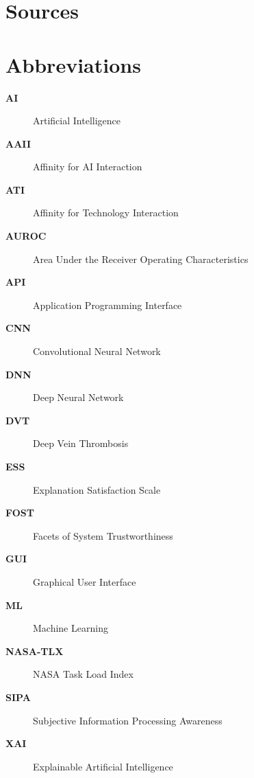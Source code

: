 {}
\listoffigures
\clearpage

{}
\listoftables
\clearpage

{}
\renewcommand*{\listlistingname}{List of Source Codes}
\listoflistings
\clearpage

{}
\chapter*{Sources}

\printbibliography[heading=subbibintoc, nottype=online, nottype=software]

\printbibliography[heading=subbibintoc, type=online, title=Websites]

\printbibliography[heading=subbibintoc, type=software, title=Software]
\clearpage

{}
\chapter*{Abbreviations}
\begin{description}
    \item [\textbf{AI}] Artificial Intelligence
    \item [\textbf{AAII}] Affinity for AI Interaction
    \item [\textbf{ATI}] Affinity for Technology Interaction
    \item [\textbf{AUROC}] Area Under the Receiver Operating Characteristics
    \item [\textbf{API}] Application Programming Interface
    \item [\textbf{CNN}] Convolutional Neural Network
    \item [\textbf{DNN}] Deep Neural Network
    \item [\textbf{DVT}] Deep Vein Thrombosis
    \item [\textbf{ESS}] Explanation Satisfaction Scale
    \item [\textbf{FOST}] Facets of System Trustworthiness
    \item [\textbf{GUI}] Graphical User Interface
    \item [\textbf{ML}] Machine Learning
    \item [\textbf{NASA-TLX}] NASA Task Load Index
    \item [\textbf{SIPA}] Subjective Information Processing Awareness
    \item [\textbf{XAI}] Explainable Artificial Intelligence
\end{description}
\clearpage

